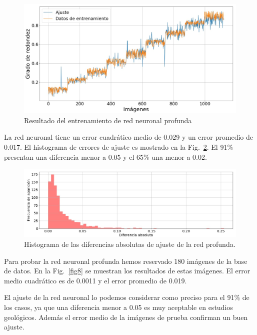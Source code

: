 \documentclass[conference]{IEEEtran}
\begin{document}
\begin{figure}[htbp]
\centerline{\includegraphics[scale=0.3]{fig6.png}}
\caption{Resultado del entrenamiento de red neuronal profunda}
\label{fig6}
\end{figure}

La red neuronal tiene un error cuadrático medio de 0.029 y un error promedio de 0.017. El histograma de errores de ajuste es mostrado en la Fig.~\ref{fig7}. El 91\% presentan una diferencia menor a 0.05 y el 65\% una menor a 0.02. 

\begin{figure}[htbp]
\centerline{\includegraphics[scale=0.3]{fig7.png}}
\caption{Histograma de las diferencias absolutas de ajuste de la red profunda.}
\label{fig7}
\end{figure}

Para probar la red neuronal profunda hemos reservado 180 imágenes de la base de datos. En la Fig.~\ref{fig8} se muestran los resultados de estas imágenes. El error medio cuadrático es de 0.0011 y el error promedio de 0.019.

El ajuste de la red neuronal lo podemos considerar como preciso para el 91\% de los casos, ya que una diferencia menor a 0.05 es muy aceptable en estudios geológicos. Además el error medio de la imágenes de prueba confirman un buen ajuste. 
\end{document}
